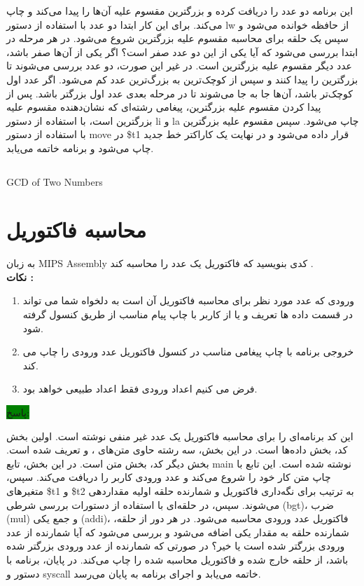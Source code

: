 {این برنامه دو عدد را دریافت کرده و بزرگترین مقسوم علیه آن‌ها را پیدا می‌کند و چاپ می‌کند. برای این کار ابتدا دو عدد با استفاده از دستور lw از حافظه خوانده می‌شود و سپس یک حلقه برای محاسبه مقسوم علیه بزرگترین شروع می‌شود. در هر مرحله در ابتدا بررسی می‌شود که آیا یکی از این دو عدد صفر است؟ اگر یکی از آن‌ها صفر باشد، عدد دیگر مقسوم علیه بزرگترین است. در غیر این صورت، دو عدد بررسی می‌شوند تا بزرگترین را پیدا کنند و سپس از کوچک‌ترین به بزرگ‌ترین عدد کم می‌شود. اگر عدد اول کوچک‌تر باشد، آن‌ها جا به جا می‌شوند تا در مرحله بعدی عدد اول بزرگتر باشد. پس از پیدا کردن مقسوم علیه بزرگترین، پیغامی رشته‌ای که نشان‌دهنده مقسوم علیه بزرگترین است، با استفاده از دستور li و la چاپ می‌شود. سپس مقسوم علیه بزرگترین با استفاده از دستور move در \$t1 قرار داده می‌شود و در نهایت یک کاراکتر خط جدید چاپ می‌شود و برنامه خاتمه می‌یابد.}

\begin{latin}
\begin{listing}[ht]
    \inputminted[linenos=true]{asm}{sources/GCD_of_Two_Numbers.mips}
    \caption{GCD of Two Numbers}
    \label{listing:}
\end{listing}
\end{latin}


\clearpage
\section{محاسبه فاکتوریل}
{به زبان MIPS Assembly کدی بنویسید که فاکتوریل یک عدد را محاسبه کند .}\\
\bf {نکات :}
\normalfont
\begin{enumerate}
    \item {ورودی که عدد مورد نظر برای محاسبه فاکتوریل آن است به دلخواه شما می تواند در قسمت داده ها  تعریف و یا از کاربر با چاپ پیام مناسب از طریق کنسول گرفته شود.}
    \item {خروجی برنامه با چاپ پیغامی مناسب در کنسول فاکتوریل عدد ورودی را چاپ می کند.}
    \item {فرض می کنیم اعداد ورودی فقط اعداد طبیعی خواهد بود.}
\end{enumerate}
\colorbox{green}{پاسخ:}\\
\normalfont

{این کد برنامه‌ای را برای محاسبه فاکتوریل یک عدد غیر منفی نوشته است.
اولین بخش کد، بخش داده‌ها است. در این بخش، سه رشته حاوی متن‌های ،  و  تعریف شده است.
بخش دیگر کد، بخش متن است. در این بخش، تابع main نوشته شده است. این تابع با چاپ متن  کار خود را شروع می‌کند و عدد ورودی کاربر را دریافت می‌کند. سپس، متغیرهای \$t1 و \$t2 به ترتیب برای نگه‌داری فاکتوریل و شمارنده حلقه اولیه مقداردهی می‌شوند.
سپس، در حلقه‌ای با استفاده از دستورات بررسی شرطی (bgt)، ضرب (mul) و جمع یکی (addi)، فاکتوریل عدد ورودی محاسبه می‌شود. در هر دور از حلقه، شمارنده حلقه به مقدار یکی اضافه می‌شود و بررسی می‌شود که آیا شمارنده از عدد ورودی بزرگتر شده است یا خیر؟ در صورتی که شمارنده از عدد ورودی بزرگتر شده باشد، از حلقه خارج شده و فاکتوریل محاسبه شده را چاپ می‌کند.
در پایان، برنامه با دستور  و syscall خاتمه می‌یابد و اجرای برنامه به پایان می‌رسد.}

